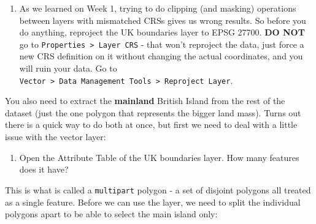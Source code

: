 \documentclass[
  letterpaper,
  DIV=11,
  numbers=noendperiod]{scrreprt}
\providecommand{\tightlist}{%
  \setlength{\itemsep}{0pt}\setlength{\parskip}{0pt}}\usepackage{longtable,booktabs,array}
\begin{document}
\begin{enumerate}
\def\labelenumi{(\arabic{enumi})}
\setcounter{enumi}{129}
\tightlist
\item
  As we learned on Week 1, trying to do clipping (and masking)
  operations between layers with mismatched CRSs gives us wrong results.
  So before you do anything, reproject the UK boundaries layer to EPSG
  27700. \textbf{DO NOT} go to
  \texttt{Properties\ \textgreater{}\ Layer\ CRS} - that won't reproject
  the data, just force a new CRS definition on it without changing the
  actual coordinates, and you will ruin your data. Go to
  \texttt{Vector\ \textgreater{}\ Data\ Management\ Tools\ \textgreater{}\ Reproject\ Layer}.
\end{enumerate}

You also need to extract the \textbf{mainland} British Island from the
rest of the dataset (just the one polygon that represents the bigger
land mass). Turns out there is a quick way to do both at once, but first
we need to deal with a little issue with the vector layer:

\begin{enumerate}
\def\labelenumi{(\arabic{enumi})}
\setcounter{enumi}{130}
\tightlist
\item
  Open the Attribute Table of the UK boundaries layer. How many features
  does it have?
\end{enumerate}

This is what is called a \texttt{multipart} polygon - a set of disjoint
polygons all treated as a single feature. Before we can use the layer,
we need to split the individual polygons apart to be able to select the
main island only:
\end{document}
